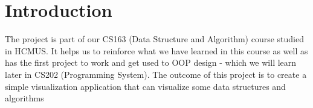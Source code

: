 \section{Introduction}


The project is part of our CS163 (Data Structure and Algorithm) course studied in HCMUS. It helps us to reinforce what we have learned in this course as well as has the first project to work and get used to OOP design - which we will learn later in CS202 (Programming System). The outcome of this project is to create a simple visualization application that can visualize some data structures and algorithms